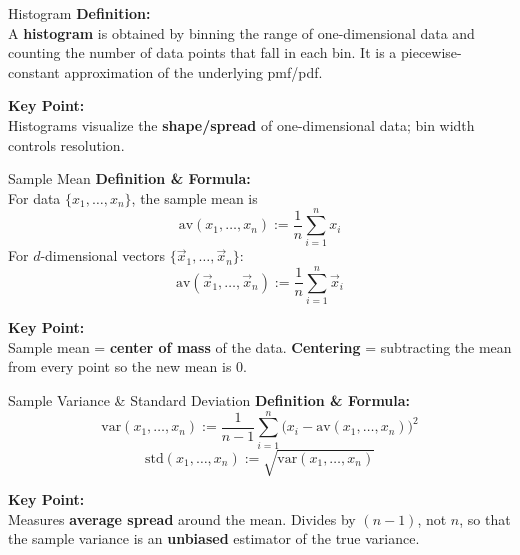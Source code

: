 \documentclass{beamer}
\begin{document}
\begin{frame}{Histogram}
\textbf{Definition:}\\[0.5mm]
A \textbf{histogram} is obtained by binning the range of one-dimensional data and counting the number of data points that fall in each bin. It is a piecewise-constant approximation of the underlying pmf/pdf.

\vspace{1.5mm}
\textbf{Key Point:}\\[0.5mm]
Histograms visualize the \textbf{shape/spread} of one-dimensional data; bin width controls resolution.
\vspace{1.5mm}
\end{frame}

\begin{frame}{Sample Mean}
\textbf{Definition \& Formula:}\\[0.5mm]
For data $\{x_1,\dots,x_n\}$, the sample mean is
\[
\text{av}(x_1,\dots,x_n) := \frac{1}{n}\sum_{i=1}^{n} x_i
\]
For $d$-dimensional vectors $\{\vec{x}_1,\dots,\vec{x}_n\}$:
\[
\text{av}(\vec{x}_1,\dots,\vec{x}_n) := \frac{1}{n}\sum_{i=1}^{n} \vec{x}_i
\]

\vspace{1.5mm}
\textbf{Key Point:}\\[0.5mm]
Sample mean = \textbf{center of mass} of the data. \textbf{Centering} = subtracting the mean from every point so the new mean is $0$.
\vspace{1.5mm}
\end{frame}

\begin{frame}{Sample Variance \& Standard Deviation}
\textbf{Definition \& Formula:}\\[0.5mm]
\[
\text{var}(x_1,\dots,x_n) := \frac{1}{n-1}\sum_{i=1}^{n}\big(x_i - \text{av}(x_1,\dots,x_n)\big)^2
\]
\[
\text{std}(x_1,\dots,x_n) := \sqrt{\text{var}(x_1,\dots,x_n)}
\]

\vspace{1.5mm}
\textbf{Key Point:}\\[0.5mm]
Measures \textbf{average spread} around the mean. Divides by $(n-1)$, not $n$, so that the sample variance is an \textbf{unbiased} estimator of the true variance.
\vspace{1.5mm}
\end{frame}
\end{document}
